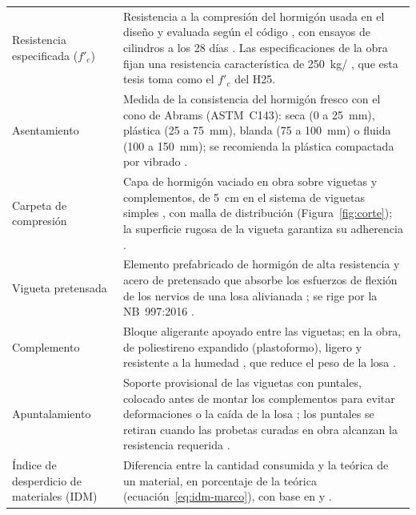 \begin{longtable}{@{}P{3.1cm}P{12.7cm}@{}}
\addlinespace
Resistencia especificada ($f'_c$) & Resistencia a la compresión del hormigón usada en el diseño y evaluada según el código \parencite[sección~2.3]{aci318_2025}, con ensayos de cilindros a los 28 días \parencite[sección~26.12.1.1]{aci318_2025}. Las especificaciones de la obra fijan una resistencia característica de 250~kg/\cmdos{} \parencite[p.~3]{uatf_et}, que esta tesis toma como el $f'_c$ del H25. \\
\addlinespace
Asentamiento & Medida de la consistencia del hormigón fresco con el cono de Abrams (ASTM~C143): seca (0 a 25~mm), plástica (25 a 75~mm), blanda (75 a 100~mm) o fluida (100 a 150~mm); se recomienda la plástica compactada por vibrado \parencite[p.~9]{ucb2025et}. \\
\addlinespace
Carpeta de compresión & Capa de hormigón vaciado en obra sobre viguetas y complementos, de 5~cm en el sistema de viguetas simples \parencite[hoja~3]{concretec2018viguetas}, con malla de distribución (Figura~\ref{fig:corte}); la superficie rugosa de la vigueta garantiza su adherencia \parencite[p.~3]{uatf_et}. \\
\addlinespace
Vigueta pretensada & Elemento prefabricado de hormigón de alta resistencia y acero de pretensado que absorbe los esfuerzos de flexión de los nervios de una losa alivianada \parencite[hojas~1 y 2]{concretec2018viguetas}; se rige por la NB~997:2016 \parencite{nb997_2016}. \\
\addlinespace
Complemento & Bloque aligerante apoyado entre las viguetas; en la obra, de poliestireno expandido (plastoformo), ligero y resistente a la humedad \parencite[hoja~1]{concretec2016plastoformo}, que reduce el peso de la losa \parencite[hoja~3]{concretec2016plastoformo}. \\
\addlinespace
Apuntalamiento & Soporte provisional de las viguetas con puntales, colocado antes de montar los complementos para evitar deformaciones o la caída de la losa \parencite[hoja~3]{concretec2016plastoformo}; los puntales se retiran cuando las probetas curadas en obra alcanzan la resistencia requerida \parencite[sección~26.12.4.1]{aci318_2025}. \\
\addlinespace
Índice de desperdicio de materiales (IDM) & Diferencia entre la cantidad consumida y la teórica de un material, en porcentaje de la teórica (ecuación~\ref{eq:idm-marco}), con base en \textcite[p.~9]{galarza2011} y \textcite[sección~2]{rossi2001}. \\
\end{longtable}
\vspace{-6pt}
\endgroup
